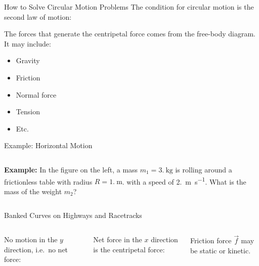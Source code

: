 \documentclass[12pt,compress,aspectratio=169]{beamer}
\begin{document}
\begin{frame}{How to Solve Circular Motion Problems}
  The condition for circular motion is the second law of motion:

  
  The forces that generate the centripetal force comes from the free-body
  diagram. It may include:
  \begin{itemize}
  \item Gravity
  \item Friction
  \item Normal force
  \item Tension
  \item Etc.
  \end{itemize}
\end{frame}



\begin{frame}{Example: Horizontal Motion}
  \begin{columns}
    
    \textbf{Example:} In the figure on the left, a mass
    $m_1=\SI{3.}{\kilo\gram}$ is rolling around a frictionless table with
    radius $R=\SI{1.}{\metre}$. with a speed of \SI{2.}{\metre\per\second}.
    What is the mass of the weight $m_2$?
  \end{columns}
\end{frame}



\begin{frame}{Banked Curves on Highways and Racetracks}
  \begin{columns}
    \centering
    

    No motion in the $y$ direction, i.e.\ no net force:


    Net force in the $x$ direction is the centripetal force:


    Friction force $\vec f$ may be static or kinetic.
  \end{columns}
\end{frame}
\end{document}
